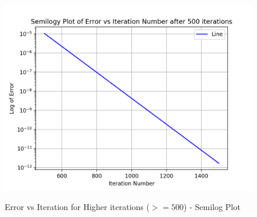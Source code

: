 \documentclass[11pt, a4paper]{article}
\begin{document}
\begin{figure}[H]
   	\centering
   	\includegraphics[scale=0.5]{semilog_500.png}
   	\label{fig:semilog_500}
   	\caption{Error vs Iteration for Higher iterations ($>= 500$) - Semilog Plot}
\end{figure}
\end{document}
